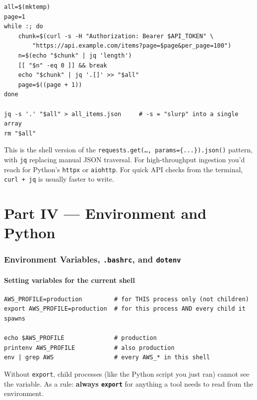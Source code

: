 \documentclass[11pt,a4paper]{article}
\newcommand{\pcmd}[1]{\texttt{\textcolor{pyKw}{#1}}}
\begin{document}
\begin{lstlisting}[style=bashstyle]
all=$(mktemp)
page=1
while :; do
    chunk=$(curl -s -H "Authorization: Bearer $API_TOKEN" \
        "https://api.example.com/items?page=$page&per_page=100")
    n=$(echo "$chunk" | jq 'length')
    [[ "$n" -eq 0 ]] && break
    echo "$chunk" | jq '.[]' >> "$all"
    page=$((page + 1))
done

jq -s '.' "$all" > all_items.json     # -s = "slurp" into a single array
rm "$all"
\end{lstlisting}

\begin{comparepy}
This is the shell version of the \pcmd{requests.get(\dots,
params=\{...\}).json()} pattern, with \pcmd{jq} replacing manual
JSON traversal. For high-throughput ingestion you'd reach for
Python's \texttt{httpx} or \texttt{aiohttp}. For quick API checks
from the terminal, \texttt{curl + jq} is usually faster to write.
\end{comparepy}

\clearpage
\part*{Part IV --- Environment and Python}

\section{Environment Variables, \texttt{.bashrc}, and \texttt{dotenv}}

\subsection*{Setting variables for the current shell}

\begin{lstlisting}[style=bashstyle]
AWS_PROFILE=production         # for THIS process only (not children)
export AWS_PROFILE=production  # for this process AND every child it spawns

echo $AWS_PROFILE              # production
printenv AWS_PROFILE           # also production
env | grep AWS                 # every AWS_* in this shell
\end{lstlisting}

\begin{gotcha}
Without \texttt{export}, child processes (like the Python script you
just ran) cannot see the variable. As a rule: \textbf{always
\texttt{export}} for anything a tool needs to read from the
environment.
\end{gotcha}
\end{document}
